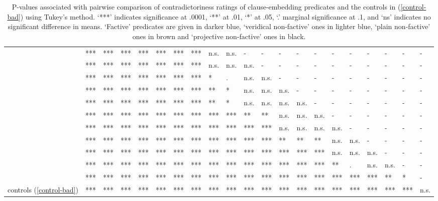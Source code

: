 \documentclass[11pt,fleqn]{article}
\newcommand{\6}{\mbox{$[\hspace*{-.6mm}[$}}
\newcommand{\9}{\mbox{$]\hspace*{-.6mm}]$}}
\begin{document}
{\begin{table}[h!]
\begin{tabular}{l l l l l l l l l l l l l l l l l l l l l}
\color{black}{\em acknowledge}\color{black}		& *** & *** & *** & *** & *** & *** & *** & n.s. & n.s. & - & - & - & - & - & - & - & - & - & - & -\\
\color{black}{\em confess}\color{black}	& *** & *** & *** & *** & *** & *** & *** & n.s. & n.s. & n.s. & - & - & - & - & - & - & - & - & - & -\\
\color{black}{\em admit}\color{black}			& *** & *** & *** & *** & *** & *** & *** & * & . & n.s. & n.s. & - & - & - & - & - & - & - & - & -\\
\color{airforceblue}{\em demonstrate}\color{black}		& *** & *** & *** & *** & *** & *** & *** & ** & * & n.s. & n.s. &  n.s. & - & - & - & - & - & - & - & -\\
\color{black}{\em establish}\color{black}	& *** & *** & *** & *** & *** & *** & *** & ** & * & n.s. & n.s. & n.s. & n.s. & - & - & - & - & - & - & -\\
\color{black}{\em confirm}\color{black}		& *** & *** & *** & *** & *** & *** & *** & *** & *** & ** & ** & n.s. & n.s. & n.s. & - & - & - & - & - & -\\
\color{blue}{\em discover}\color{black}		& *** & *** & *** & *** & *** & *** & *** & *** & *** & *** & *** & n.s. & n.s. & n.s. & n.s. & - & - & - & - & -\\
\color{blue}{\em see}\color{black}			& *** & *** & *** & *** & *** & *** & *** & *** & *** & *** & *** & ** & ** & ** & n.s. & n.s. & - & - & - & -\\
\color{blue}{\em know}\color{black}			& *** & *** & *** & *** & *** & *** & *** & *** & *** & *** & *** & *** & *** & *** & n.s. & n.s. & n.s. & - & - & -\\
\color{black}{\em prove}\color{black}			& *** & *** & *** & *** & *** & *** & *** & *** & *** & *** & *** & *** & *** & *** & ** & . & n.s. & n.s. & -  & -\\
\color{airforceblue}{\em be right}\color{black}		& *** & *** & *** & *** & *** & *** & *** & *** & ***  & ***  & *** & *** & *** & *** & *** & *** & *** & ** & *  & -\\
\color{black}controls (\ref{control-bad})\color{black}		& *** & *** & *** & *** & *** & *** & *** & *** & ***  & ***  & *** & *** & *** & *** & *** & *** & *** & *** & ***  & n.s. \\

\bottomrule
\end{tabular}
\caption{P-values associated with pairwise comparison of contradictoriness ratings of clause-embedding predicates and the controls in (\ref{control-bad}) using Tukey's method. `***' indicates significance at .0001, `**' at .01, `*' at .05, `.' marginal significance at .1, and `ns' indicates no significant difference in means. `Factive' predicates are given in darker blue, `veridical non-factive' ones in lighter blue, `plain non-factive' ones in brown and `projective non-factive' ones in black.}\label{t-pairwise}
\end{table}

}
\end{document}
